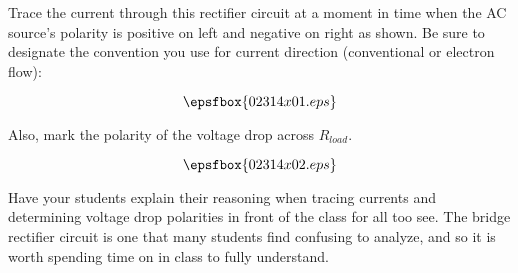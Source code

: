

Trace the current through this rectifier circuit at a moment in time when the AC source's polarity is positive on left and negative on right as shown.  Be sure to designate the convention you use for current direction (conventional or electron flow):

$$\epsfbox{02314x01.eps}$$

Also, mark the polarity of the voltage drop across $R_{load}$.







$$\epsfbox{02314x02.eps}$$







Have your students explain their reasoning when tracing currents and determining voltage drop polarities in front of the class for all too see.  The bridge rectifier circuit is one that many students find confusing to analyze, and so it is worth spending time on in class to fully understand.





